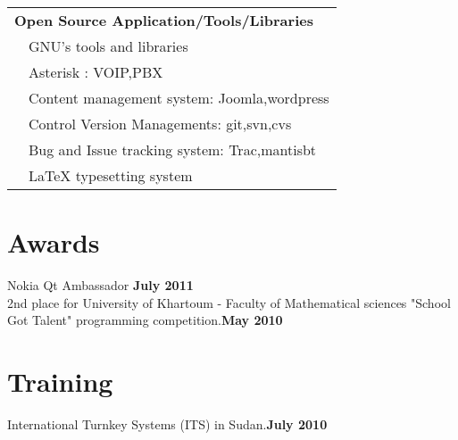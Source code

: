 \documentclass[margin,line]{resume}
\begin{document}
\begin{resume}
\begin{tabular}{ l  l }
\multicolumn{2}{l}{\textbf{Open Source Application/Tools/Libraries}} \\
& GNU's tools and libraries\\
& Asterisk : VOIP,PBX \\
& Content management system: Joomla,wordpress \\
& Control Version Managements: git,svn,cvs\\
& Bug and Issue tracking system: Trac,mantisbt \\
& \LaTeX{} typesetting system\\
\end{tabular}


    \section{\mysidestyle  Awards} 
Nokia Qt Ambassador \hfill \textbf{July 2011}\\
2nd place for University of Khartoum - Faculty of Mathematical sciences "School Got Talent" programming competition.\hfill \textbf{May 2010}\vspace{-3mm}\\\vspace{-1mm}%

    \section{\mysidestyle  Training} 

International Turnkey Systems (ITS) in Sudan.\hfill \textbf{July 2010}\vspace{-3mm}\\\vspace{-1mm}%





\end{resume}
\end{document}
